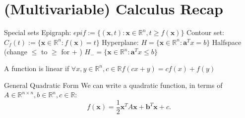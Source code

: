 \documentclass[a4paper]{article}
\begin{document}
\section{(Multivariable) Calculus Recap}
\begin{subbox}{Special sets}
    Epigraph:
$
    epi f := \{(\mathbf{x},t): \mathbf{x} \in \mathbb{R}^n, t \geq f(\mathbf{x})\}
     $\newline
    Contour set:
    $
    C_f(t) := \{\mathbf{x}\in \mathbb{R}^n: f(\mathbf{x}) = t\}
      $\newline
    Hyperplane:
    $
    H = \{\mathbf{x} \in \mathbb{R}^n: \mathbf{a}^Tx = b \} 
    $\newline
    Halfspace (change $\leq$ to $\geq$ for +  )
    $H_- = \{\mathbf{x} \in \mathbb{R}^n: \mathbf{a}^Tx \leq b \} 
    $\newline


\end{subbox}

A function is linear if $\forall x,y\in\mathbb{R}^n, c\in \mathbb{R} f(cx + y) = cf(x) + f(y)$ 

\begin{subbox}{General Quadratic Form}
    We can write a quadratic function, in terms of $A\in \mathbb{R}^{n\times n}, b\in \mathbb{R}^n, c\in \mathbb{R}$:
    \[
    f(\mathbf{x}) = \frac{1}{2}\mathbf{x}^TA\mathbf{x} + \mathbf{b}^T\mathbf{x} + c
    .\] 
\end{subbox}
\end{document}
